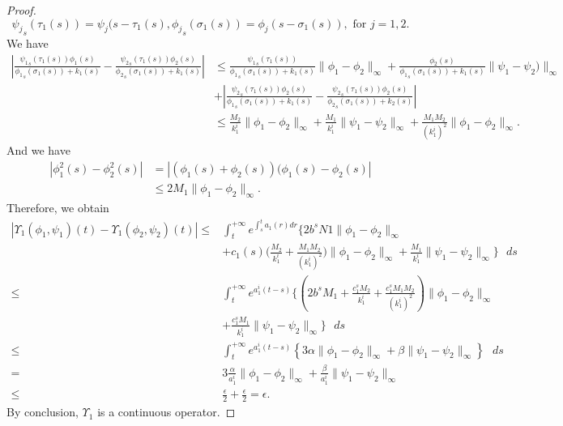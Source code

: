 \documentclass[[a4paper,10pt]{article}
\begin{document}
\begin{proof}
  $${\psi_j}_s(\tau_1(s))=\psi_j(s-\tau_1(s),{\phi_j}_s(\sigma_1(s))=\phi_j(s-\sigma_1(s)),\text{ for }j=1,2.$$ 
We have{\small
\begin{align*}
 \left|\frac{{\psi_1}_s(\tau_1(s))\phi_1(s)}{{\phi_1}_s(\sigma_1(s))+k_1(s)}-
\frac{{\psi_2}_s(\tau_1(s))\phi_2(s)}{{\phi_2}_s(\sigma_1(s))+k_1(s)}\right|
&\leq\frac{{\psi_1}_s(\tau_1(s))}{{\phi_1}_s(\sigma_1(s))+k_1(s)}\|\phi_1-\phi_2\|_{\infty}+\frac{\phi_2(s)}{{\phi_1}_s(\sigma_1(s))+k_1(s)}\|\psi_1-\psi_2)\|_{\infty}\\
&+\left|\frac{{\psi_2}_s(\tau_1(s))\phi_2(s)}{{\phi_1}_s(\sigma_1(s))+k_1(s)}-\frac{{\psi_2}_s(\tau_1(s))\phi_2(s)}{{\phi_2}_s(\sigma_1(s))+k_2(s)}\right|\\
&\leq\frac{M_2}{k_1^i}\|\phi_1-\phi_2\|_{\infty}+\frac{M_1}{k_1^i}\|\psi_1-\psi_2\|_{\infty}+\frac{M_1M_2}{(k_1^i)^2}\|\phi_1-\phi_2\|_{\infty}.
\end{align*}}
And we have
\begin{align*}
|\phi_1^2(s)-\phi_2^2(s)|&= |(\phi_1(s)+\phi_2(s))(\phi_1(s)-\phi_2(s)|\\
&\leq 2M_1\|\phi_1-\phi_2\|_{\infty}.
\end{align*}
Therefore, we obtain 
 {\small \begin{align*}
  |\Upsilon_1(\phi_1,\psi_1)(t)-\Upsilon_1(\phi_2,\psi_2)(t)| \leq&\displaystyle{\int_t^{+\infty} e^{\int^t_s a_1(r)dr}\bigg\{2b^sN1 \|\phi_1-\phi_2\|_{\infty}\text{ } }\\
 &+ c_1(s)\bigg(\frac{M_2}{k_1^i}+\frac{M_1M_2}{(k_1^i)^2}\bigg)\|\phi_1-\phi_2\|_{\infty} +\frac{M_1}{k_1^i}\|\psi_1-\psi_2\|_{\infty}\bigg\}\text{ } ds\\
  \leq&{\displaystyle{\int_t^{+\infty} e^{a_1^i(t-s)}}}\bigg\{\left(2b^sM_1 +\frac{c_1^sM_2}{k_1^i}+\frac{c_1^sM_1M_2}{(k_1^i)^2}\right)\|\phi_1-\phi_2\|_{\infty}\\
&+ \frac{c_1^sM_1}{k_1^i}\|\psi_1-\psi_2\|_{\infty}\bigg\}\text{ } ds\\
   \leq&\displaystyle{\int_t^{+\infty} e^{a_1^i(t-s)}\left\lbrace 3\alpha \|\phi_1-\phi_2\|_{\infty}+\beta \|\psi_1-\psi_2\|_{\infty}\right\rbrace\text{ } ds}\\
   = &3\frac{\alpha}{a_1^i} \|\phi_1-\phi_2\|_{\infty}+\frac{\beta}{a_1^i} \|\psi_1-\psi_2\|_{\infty}\\
\leq &\frac{\epsilon}{2}+\frac{\epsilon}{2}=\epsilon.
  \end{align*}}
 By conclusion, $\Upsilon_1$ is a continuous operator.
  

\end{proof}
\end{document}
